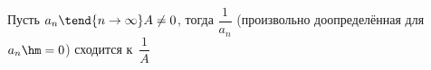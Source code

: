 
Пусть $a_n\tend{n\to\infty}A\neq0$, тогда $\dfrac1{a_n}$ (произвольно доопределённая для $a_n\hm=0$) сходится к~$\dfrac1A$
